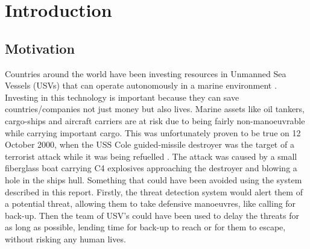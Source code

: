 \documentclass[bsc,frontabs,twoside,singlespacing,parskip,deptreport]{infthesis}     %
\begin{document}

\tableofcontents



\chapter{Introduction}
\section{Motivation}
Countries around the world have been investing resources in Unmanned Sea Vessels (USVs) that can operate autonomously in a marine environment \cite{usvcase}.  Investing in this technology is important because they can save countries/companies not just money but also lives. Marine assets like oil tankers, cargo-ships and aircraft carriers are at risk due to being fairly non-manoeuvrable while carrying important cargo. This was unfortunately proven to be true on 12 October 2000, when the USS Cole guided-missile destroyer was the target of a terrorist attack while it was being refuelled \cite{combs2009encyclopedia}. The attack was caused by a small fiberglass boat carrying C4 explosives approaching the destroyer and blowing a hole in the ships hull. Something that could have been avoided using the system described in this report. Firstly, the threat detection system would alert them of a potential threat, allowing them to take defensive manoeuvres, like calling for back-up. Then  the team of USV's could have been used to delay the threats for as long as possible, lending time for back-up to reach or for them to escape, without risking any human lives.
\end{document}
